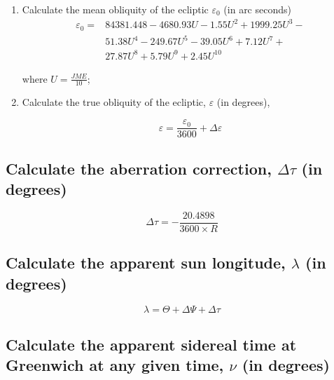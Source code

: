\documentclass{article}
\begin{document}
\begin{enumerate}
\item Calculate the mean obliquity of the ecliptic $\varepsilon_0$ (in arc
  seconds)
  \begin{equation}
    \label{eq:epsilon_0}
    \begin{split}
      \varepsilon_0 = & 84381.448 - 4680.93U - 1.55U^2 + 1999.25U^3 - \\
      & 51.38U^4 - 249.67U^5 - 39.05U^6 + 7.12U^7 + \\
      & 27.87U^8 + 5.79U^9 + 2.45U^{10}
    \end{split}
  \end{equation}

  \par where $U = \frac{JME}{10}$;

\item Calculate the true obliquity of the ecliptic, $\varepsilon$ (in degrees),

  \begin{equation}
    \label{eq:epsilon_0}
    \varepsilon = \frac{\varepsilon_0}{3600} + \Delta\varepsilon
  \end{equation}
\end{enumerate}

\subsection{Calculate the aberration correction, $\Delta\tau$ (in degrees)}

\begin{equation}
  \label{eq:delta_t}
  \Delta\tau = -\frac{20.4898}{3600 \times R}
\end{equation}

\subsection{Calculate the apparent sun longitude, $\lambda$ (in degrees)}

\begin{equation}
  \label{eq:lambda}
  \lambda = \Theta + \Delta\Psi + \Delta\tau
\end{equation}

\subsection{Calculate the apparent sidereal time at Greenwich at any
  given time, $\nu$ (in degrees)}
\end{document}
